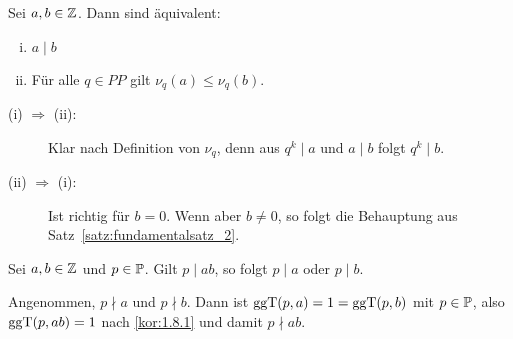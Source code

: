 	\begin{korollar}
		Sei $a,b \in \mathbb{Z}$. \marginnote{[12]}
		Dann sind äquivalent:
		\begin{enumerate}[(i)]
			\item $a \mid b$
			\item Für alle $q \in PP$ gilt $\nu_q(a) \leq \nu_q(b)$.
		\end{enumerate}
	\end{korollar}
	\begin{beweis}
		\begin{description}
			\item[(i) $\Rightarrow$ (ii):] Klar nach Definition von $\nu_q$, denn aus $q^k \mid a$ und $a \mid b$ folgt $q^k \mid b$.
			\item[(ii) $\Rightarrow$ (i):] Ist richtig für $b = 0$.
			Wenn aber $b \neq 0$, so folgt die Behauptung aus Satz~\ref{satz:fundamentalsatz_2}.
		\end{description}
	\end{beweis}

	\begin{lemma}
		\label{lemma:1.13}
		Sei $a,b \in \mathbb{Z}$ und $p \in \mathbb{P}$. \marginnote{[13]}
		Gilt $p \mid ab$, so folgt $p \mid a$ oder $p \mid b$.
	\end{lemma}

	\begin{beweis}
		Angenommen, $p \nmid a$ und $p \nmid b$.
		Dann ist $\operatorname{ggT}(p,a) = 1 = \operatorname{ggT}(p,b)$ mit $p \in \mathbb{P}$, also $\operatorname{ggT}(p,ab) = 1$ nach \ref{kor:1.8.1} und damit $p \nmid ab$.
	\end{beweis}
\cleardoubleoddemptypage